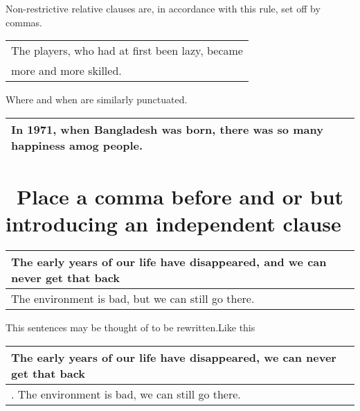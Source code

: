 \documentclass[10pt]{report}
\begin{document}
\pagebreak
\noindent
Non-restrictive relative clauses are, in accordance with this rule, set off by commas.


\begin{table}[!tbh]
    \centering
        \begin{tabular}{|l|}
        \hline
        The players, who had at first been lazy, became\\
more and more skilled.\\
        \hline
        
	  
        \end{tabular}
    
\end{table}
\noindent
Where and when are similarly punctuated.

\begin{table}[!tbh]
    \centering
        \begin{tabular}{|l|}
        \hline
        In 1971, when Bangladesh was born, there was so many happiness amog people. \\
        \hline
       
	  
        \end{tabular}
    
\end{table}


\section {\bfseries \ Place a comma before and or but introducing an independent
clause}\label{sec:four}

\begin{table}[!tbh]
    \centering
        \begin{tabular}{|l|}
        \hline
      The early years of our life have disappeared, and we can never get that back\\
        \hline
        The environment is bad, but we can still go there.\\
\hline

 \end{tabular}
 \end{table}

This sentences may be thought of to be rewritten.Like this

\begin{table}[!tbh]
    \centering
        \begin{tabular}{|l|}
        \hline
      The early years of our life have disappeared, we can never get that back\\
        \hline.
        The environment is bad, we can still go there.\\
\hline

 \end{tabular}
 \end{table}
 
\end{document}
